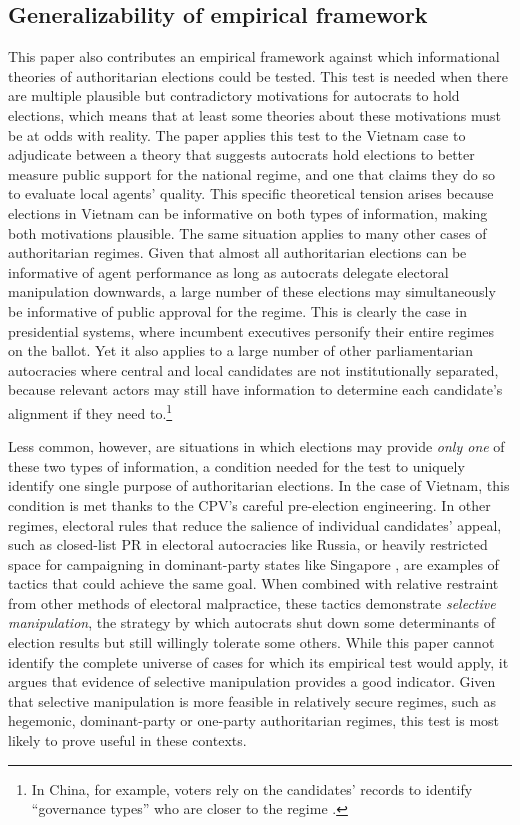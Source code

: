 \documentclass[12pt]{article}
\newcommand\fnote[1]{\footnote{\baselineskip=2\normalbaselineskip#1}}
\newcommand{\1}{\mathbbm{1}}
\begin{document}
\subsection{Generalizability of empirical framework}

This paper also contributes an empirical framework against which informational theories of authoritarian elections could be tested. This test is needed when there are multiple plausible but contradictory motivations for autocrats to hold elections, which means that at least some theories about these motivations must be at odds with reality. The paper applies this test to the Vietnam case to adjudicate between a theory that suggests autocrats hold elections to better measure public support for the national regime, and one that claims they do so to evaluate local agents' quality. This specific theoretical tension arises because elections in Vietnam can be informative on both types of information, making both motivations plausible. The same situation applies to many other cases of authoritarian regimes. Given that almost all authoritarian elections can be informative of agent performance as long as autocrats delegate electoral manipulation downwards, a large number of these elections may simultaneously be informative of public approval for the regime. This is clearly the case in presidential systems, where incumbent executives personify their entire regimes on the ballot. Yet it also applies to a large number of other parliamentarian autocracies where central and local candidates are not institutionally separated, because relevant actors may still have information to determine each candidate's alignment if they need to.\fnote{In China, for example, voters rely on the candidates' records to identify ``governance types'' who are closer to the regime \citep{Manion2014}.} 

Less common, however, are situations in which elections may provide \textit{only one} of these two types of information, a condition needed for the test to uniquely identify one single purpose of authoritarian elections. In the case of Vietnam, this condition is met thanks to the CPV's careful pre-election engineering. In other regimes, electoral rules that reduce the salience of individual candidates' appeal, such as closed-list PR in electoral autocracies like Russia, or heavily restricted space for campaigning in dominant-party states like Singapore \citep{Tan2013}, are examples of tactics that could achieve the same goal. When combined with relative restraint from other methods of electoral malpractice, these tactics demonstrate \textit{selective manipulation}, the strategy by which autocrats shut down some determinants of election results but still willingly tolerate some others. While this paper cannot identify the complete universe of cases for which its empirical test would apply, it argues that evidence of selective manipulation provides a good indicator. Given that selective manipulation is more feasible in relatively secure regimes, such as hegemonic, dominant-party or one-party authoritarian regimes, this test is most likely to prove useful in these contexts.
\end{document}
